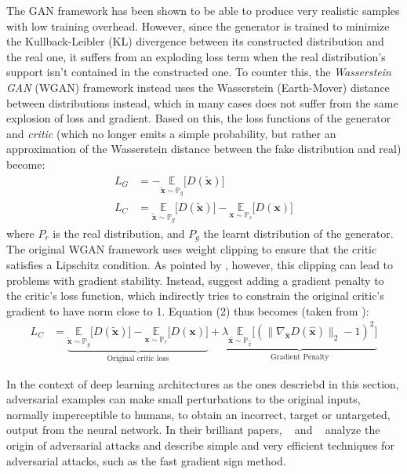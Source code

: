 The GAN framework has been shown to be able to produce very realistic samples with low training overhead. However, since the generator is trained to minimize the Kullback-Leibler (KL) divergence between its constructed distribution and the real one, it suffers from an exploding loss term when the real distribution's support isn't contained in the constructed one. To counter this, the \textit{Wasserstein GAN} \cite{arjovsky2017wasserstein} (WGAN) framework instead uses the Wasserstein (Earth-Mover) distance between distributions instead, which in many cases does not suffer from the same explosion of loss and gradient. Based on this, the loss functions of the generator and \textit{critic} (which no longer emits a simple probability, but rather an approximation of the Wasserstein distance between the fake distribution and real) become:
\begin{align}
    L_G &= -\underset{\boldsymbol{\widetilde{x}} \sim \mathbb{P}_{g}}{\mathbb{E}}  \big[D(\boldsymbol{\widetilde{x}})\big] \\
    L_C &= \underset{\boldsymbol{\widetilde{x}} \sim \mathbb{P}_{g}}{\mathbb{E}}  \big[D(\boldsymbol{\widetilde{x}})\big] - \underset{\boldsymbol{x} \sim \mathbb{P}_{r}}{\mathbb{E}}  \big[D(\boldsymbol{x})\big]
\end{align}
where $P_r$ is the real distribution, and $P_g$ the learnt distribution of the generator. \\
The original WGAN framework uses weight clipping to ensure that the critic satisfies a Lipschitz condition. As pointed by \cite{gulrajani2017improved}, however, this clipping can lead to problems with gradient stability. Instead, \cite{gulrajani2017improved} suggest adding a gradient penalty to the critic's loss function, which indirectly tries to constrain the original critic's gradient to have norm close to 1. Equation (2) thus becomes (taken from \cite{gulrajani2017improved}):
\begin{align}
    L_C &= \underbrace{\underset{\boldsymbol{\widetilde{x}} \sim \mathbb{P}_{g}}{\mathbb{E}}  \big[D(\boldsymbol{\widetilde{x}})\big] - \underset{\boldsymbol{x} \sim \mathbb{P}_{r}}{\mathbb{E}}  \big[D(\boldsymbol{x})\big]}_\text{Original critic loss}  + \underbrace{\lambda \underset{\boldsymbol{\hat{x}} \sim \mathbb{P}_{\hat{x}}}{\mathbb{E}}  \big[(\lVert \nabla_{\boldsymbol{\hat{x}}} D(\boldsymbol{\hat{x}}) \rVert_2 - 1)^2\big]}_\text{Gradient Penalty}
\end{align}

In the context of deep learning architectures as the ones descriebd in this
section, adversarial examples can make small perturbations to the original inputs, 
normally imperceptible to humans, to obtain an incorrect, target or untargeted, 
output from the neural network. In their brilliant papers, ~\cite{szegedy2013intriguing} and
~\cite{goodfellow2014explaining} analyze the origin of adversarial attacks and
describe simple and very efficient techniques for adversarial attacks, such as the fast gradient sign method. 


